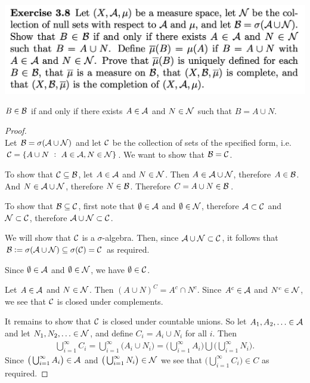 \newpage
\begin{mdframed}
\includegraphics[width=400pt]{img/analysis--berkeley-202a-hw04-c88b.png}
\end{mdframed}

\begin{claim*}\label{claim-3-8-1}
  $B \in \mathcal B$ if and only if there exists $A \in \mathcal A$ and $N \in \mathcal N$ such that $B = A \cup N$.
\end{claim*}

\begin{proof}~\\
  Let $\mathcal B = \sigma(\mathcal A \cup \mathcal N)$ and let $\mathcal C$ be the collection of sets of the specified form,
  i.e. $\mathcal C = \{A \cup N ~:~ A \in \mathcal A, N \in \mathcal N\}$. We want to show that $\mathcal B = \mathcal C$.

  To show that $\mathcal C \subseteq \mathcal B$, let $A \in \mathcal A$ and $N \in \mathcal N$. Then $A \in \mathcal A \cup \mathcal N$,
  therefore $A \in \mathcal B$. And $N \in \mathcal A \cup \mathcal N$, therefore $N \in \mathcal B$.
  Therefore $C = A \cup N \in \mathcal B$.

  To show that $\mathcal B \subseteq \mathcal C$, first note that $\emptyset \in \mathcal A$ and $\emptyset \in \mathcal N$,
  therefore $\mathcal A \subset \mathcal C$ and $\mathcal N \subset \mathcal C$, therefore $\mathcal A \cup \mathcal N \subset \mathcal C$.

  We will show that $\mathcal C$ is a $\sigma$-algebra. Then, since $\mathcal A \cup \mathcal N \subset \mathcal C$, it follows
  that $\mathcal B := \sigma(\mathcal A \cup \mathcal N) \subseteq \sigma(\mathcal C) = \mathcal C$ as required.

  Since $\emptyset \in \mathcal A$ and $\emptyset \in \mathcal N$, we have $\emptyset \in \mathcal C$.

  Let $A \in \mathcal A$ and $N \in \mathcal N$. Then $(A \cup N)^C = A^c \cap N^c$. Since $A^c \in \mathcal A$
  and $N^c \in \mathcal N$, we see that $\mathcal C$ is closed under complements.

  It remains to show that $\mathcal C$ is closed under countable unions. So let $A_1, A_2, \ldots \in \mathcal A$ and
  let $N_1, N_2, \ldots \in \mathcal N$, and define $C_i = A_i \cup N_i$ for all $i$. Then
  \begin{align*}
    \bigcup_{i=1}^\infty C_i = \bigcup_{i=1}^\infty \big(A_i \cup N_i\big) = \big(\bigcup_{i=1}^\infty A_i\big) \bigcup \big(\bigcup_{i=1}^\infty N_i \big).
  \end{align*}
  Since $\big(\bigcup_{i=1}^\infty A_i\big) \in \mathcal A$ and $\big(\bigcup_{i=1}^\infty N_i\big) \in \mathcal N$ we see that $\big(\bigcup_{i=1}^\infty C_i\big) \in C$ as required.
\end{proof}

